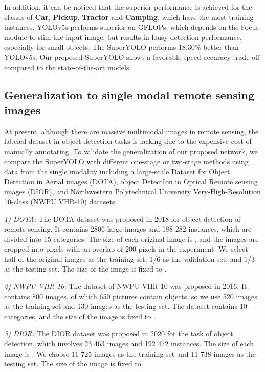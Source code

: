 In addition, it can be noticed that the superior performance is achieved for the classes of \textbf{Car}, \textbf{Pickup}, \textbf{Tractor} and \textbf{Camping}, which have the most training instances. YOLOv5s performs superior on GFLOPs, which depends on the Focus module to slim the input image, but results in lousy detection performance, especially for small objects. The SuperYOLO performs 18.30\%  better than YOLOv5s. Our proposed SuperYOLO shows a favorable speed-accuracy trade-off compared to the state-of-the-art models.








\subsection{Generalization to single modal remote sensing images}
At present, although there are massive multimodal images in remote sensing, the labeled dataset in object detection tasks is lacking due to the expensive cost of manually annotating. To validate the generalization of our proposed network, we compare the SuperYOLO with different one-stage or two-stage methods using data from the single modality including a large-scale Dataset for Object Detection in Aerial images (DOTA), object DetectIon in Optical Remote sensing images (DIOR), and Northwestern Polytechnical University Very-High-Resolution 10-class (NWPU VHR-10) datasets.

\textit{1) DOTA:} The DOTA dataset was proposed in 2018 for object detection of remote sensing. It contains 2806 large images and 188 282 instances, which are divided into 15 categories. The size of each original image is , and the images are cropped into  pixels with an overlap of 200 pixels in the experiment. We select half of the original images as the training set, 1/6 as the validation set, and 1/3 as the testing set.  The size of the image is fixed to .

\textit{2) NWPU VHR-10:} The dataset of NWPU VHR-10 was proposed in 2016. It contains 800 images, of which 650 pictures contain objects, so we use 520 images as the training set and 130 images as the testing set. The dataset contains 10 categories, and the size of the image is fixed to . 

\textit{3) DIOR:} The DIOR dataset was proposed in 2020 for the task of object detection, which involves 23 463 images and 192 472 instances. The size of each image is . We choose 11 725 images as the training set and 11 738 images as the testing set. The size of the image is fixed to 

